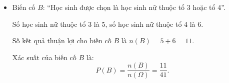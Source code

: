 \begin{bt}
{\begin{enumerate}[a)]
\begin{itemize}
				Số học sinh thuộc tổ 1 là $9$ học sinh, nên số kết quả thuận lợi cho $A$ là $n(A) = 9$.
				
				Xác suất của biến cố $A$ là:
				$$P(A) = \dfrac{n(A)}{n(\Omega)} = \dfrac{9}{41}.$$
				\item Biến cố $B$: ``Học sinh được chọn là học sinh nữ thuộc tổ 3 hoặc tổ 4''.
				
				Số học sinh nữ thuộc tổ 3 là $5$, số học sinh nữ thuộc tổ 4 là $6$.
				
				Số kết quả thuận lợi cho biến cố $B$ là $n(B) = 5 + 6 = 11$.
				
				Xác suất của biến cố $B$ là:
				$$P(B) = \dfrac{n(B)}{n(\Omega)} = \dfrac{11}{41}.$$
			\end{itemize}
		\end{enumerate}
}
\end{bt}

